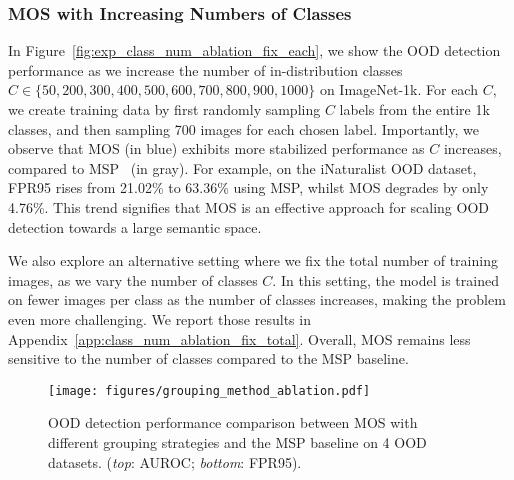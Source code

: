 \documentclass[final]{cvpr}
\begin{document}
\subsubsection{MOS with Increasing Numbers of Classes}
\label{sec:class_num_ablation}
\vspace{-0.2cm}
In Figure~\ref{fig:exp_class_num_ablation_fix_each}, we show the OOD detection performance as we increase the number of in-distribution classes $C\in \{50, 200, 300, 400, 500, 600, 700, 800, 900, 1000\}$ on ImageNet-1k. For each $C$, we create training data by first randomly sampling $C$ labels from the entire 1k classes, and then sampling 700 images for each chosen label.  
Importantly, we observe that MOS (in blue) exhibits more stabilized performance as $C$ increases, compared to MSP~\cite{hendrycks2016baseline} (in gray). For example, on the iNaturalist OOD dataset, FPR95 rises from 21.02\% to 63.36\% using MSP, whilst MOS degrades by only 4.76\%. This trend signifies that MOS is an effective approach for scaling OOD detection towards a large semantic space. 



We also explore an alternative setting where we fix the total number of training images, as we vary the number of classes $C$. In this setting, the model is trained on fewer images per class as the number of classes increases, making the problem even more challenging. We  report those results in Appendix~\ref{app:class_num_ablation_fix_total}. Overall, MOS remains less sensitive to the number of classes compared to the MSP baseline.







\begin{figure}[t]
    \centering
    \vspace{-0.3cm}
    \texttt{[image: figures/grouping\_method\_ablation.pdf]}
    \caption{\small{OOD detection performance comparison between MOS with different grouping strategies and the MSP baseline on 4 OOD datasets. (\textit{top}: AUROC; \textit{bottom}: FPR95).}}
    \label{fig:exp_group_method_ablation}
    \vspace{-0.3cm}
\end{figure}

\vspace{-0.3cm}
\end{document}

